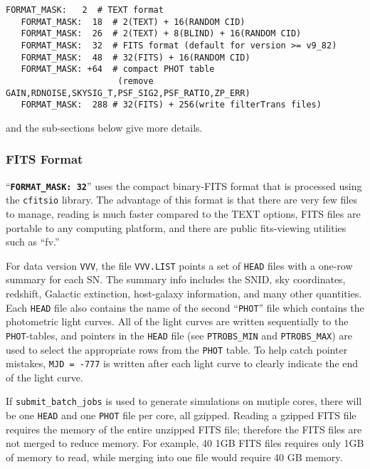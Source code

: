 \documentclass[12pt]{article}
\begin{document}
\begin{Verbatim}[frame=single]
   FORMAT_MASK:   2  # TEXT format
   FORMAT_MASK:  18  # 2(TEXT) + 16(RANDOM CID)
   FORMAT_MASK:  26  # 2(TEXT) + 8(BLIND) + 16(RANDOM CID)
   FORMAT_MASK:  32  # FITS format (default for version >= v9_82)
   FORMAT_MASK:  48  # 32(FITS) + 16(RANDOM CID)
   FORMAT_MASK: +64  # compact PHOT table 
                      (remove GAIN,RDNOISE,SKYSIG_T,PSF_SIG2,PSF_RATIO,ZP_ERR)
   FORMAT_MASK:  288 # 32(FITS) + 256(write filterTrans files)
\end{Verbatim}
%
and the sub-sections below give more details.

   \subsubsection{FITS Format}
   \label{sss:fits_format}
``{\tt\bf FORMAT\_MASK:  32}'' 
uses the compact binary-FITS format that is processed using the 
{\tt cfitsio} library. 
The advantage of this format is that there are very few files
to manage, reading is much faster compared to the TEXT options, 
FITS files are portable to any computing platform,
and there are public fits-viewing utilities such as ``fv.''

For data version {\tt VVV}, the file {\tt VVV.LIST} points 
a set of {\tt HEAD} files with a one-row summary for each SN.
The summary info includes the SNID, sky coordinates, redshift,
Galactic extinction, host-galaxy information, and many other quantities.
Each {\tt HEAD} file also contains the name of the second 
``{\tt PHOT}'' file which contains the photometric light curves.
All of the light curves are written sequentially to the
{\tt PHOT}-tables, and pointers in the {\tt HEAD} file 
(see {\tt PTROBS\_MIN} and {\tt PTROBS\_MAX}) 
are used to select the appropriate rows from the {\tt PHOT} table.
To help catch pointer mistakes, {\tt MJD = -777} is written
after each light curve to clearly indicate the end of the light curve.


If {\tt submit\_batch\_jobs} is used to generate simulations on mutiple cores,
there will be one {\tt HEAD} and one {\tt PHOT} file per core, all gzipped. 
Reading a gzipped FITS file requires the memory of the entire unzipped FITS
file; therefore the FITS files are not merged to reduce memory.
For example, 40 1GB FITS files requires only 1GB of memory to read,
while merging into one file would require 40 GB memory.
\end{document}
